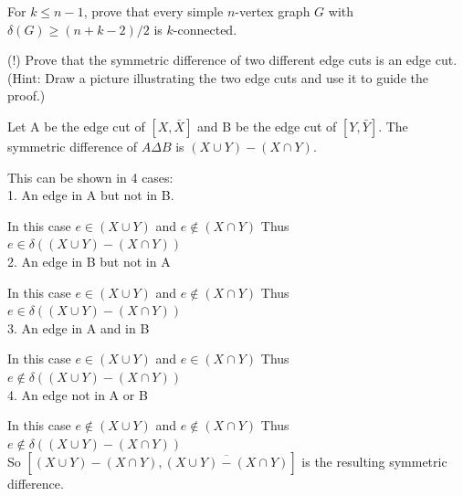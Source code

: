 \documentclass[12pt]{article}
\newenvironment{question}[2][Question]{\begin{trivlist}
\item[\hskip \labelsep {\bfseries #1}\hskip \labelsep {\bfseries #2.}]}{\end{trivlist}}
\begin{document}
\begin{question}{2}
For $k \leq n - 1$, prove that every simple $n$-vertex graph $G$ with $\delta(G) \geq (n+k-2)/2$ is $k$-connected.
\end{question}


\begin{question}{3}

($!$) Prove that the symmetric difference of two different edge cuts is an edge cut. (Hint: Draw a picture illustrating the two edge cuts and use it to guide the proof.)

Let A be the edge cut of  $[X,\bar{X}]$ and B be the edge cut of $[Y,\bar{Y}]$. The symmetric difference of $A \Delta B$ is $(X \cup Y) - (X \cap Y)$. 

This can be shown in 4 cases: \\
1. An edge in A but not in B.

	In this case $e \in (X \cup Y)$ and $e \notin (X \cap Y)$ Thus $e \in \delta((X \cup Y) - (X \cap Y))$\\	
2. An edge in B but not in A

	In this case $e \in (X \cup Y)$ and $e \notin (X \cap Y)$ Thus $e \in \delta((X \cup Y) - (X \cap Y))$\\	
3. An edge in A and in B

	In this case $e \in (X \cup Y)$ and $e \in (X \cap Y)$ Thus $e \notin \delta((X \cup Y) - (X \cap Y))$\\	
4. An edge not in A or B

	In this case $e \notin (X \cup Y)$ and $e \notin (X \cap Y)$ Thus $e \notin \delta((X \cup Y) - (X \cap Y))$\\	
	
So $[(X \cup Y) - (X \cap Y), \overline{(X \cup Y) - (X \cap Y)}]$ is the resulting symmetric difference.

	
\end{question}
\end{document}
